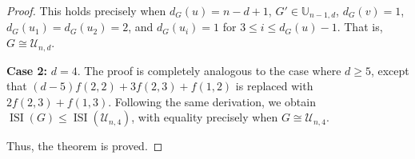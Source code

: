 \documentclass[10pt,a4paper]{amsart}
\newcommand{\ISI}{\operatorname{ISI}}
\newcommand{\UU}{\mathbb{U}}
\begin{document}
\begin{proof}
This holds precisely when \(d_G(u) = n-d+1\), \(G' \in \UU_{n-1,d}\), \(d_G(v) = 1\), \(d_G(u_1) = d_G(u_2) = 2\), and \(d_G(u_i) = 1\) for \(3 \leq i \leq d_G(u)-1\). That is, \(G \cong \mathcal{U}_{n,d}\).

\textbf{Case 2:} \(d = 4\). The proof is completely analogous to the case where \(d \geq 5\), except that \((d-5)f(2,2) + 3f(2,3) + f(1,2)\) is replaced with \(2f(2,3) + f(1,3)\). Following the same derivation, we obtain \(\ISI(G) \leq \ISI(\mathcal{U}_{n,4})\), with equality precisely when \(G \cong \mathcal{U}_{n,4}\).

Thus, the theorem is proved.
\end{proof}
\end{document}
